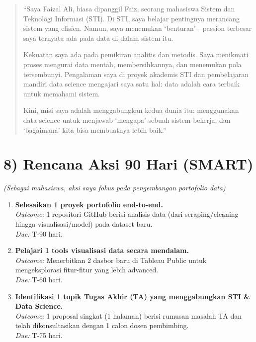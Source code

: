 \documentclass[
  letterpaper,
  DIV=11,
  numbers=noendperiod]{scrreprt}
\providecommand{\tightlist}{%
  \setlength{\itemsep}{0pt}\setlength{\parskip}{0pt}}
\begin{document}
\begin{quote}
``Saya Faizal Ali, biasa dipanggil Faiz, seorang mahasiswa Sistem dan
Teknologi Informasi (STI). Di STI, saya belajar pentingnya merancang
sistem yang efisien. Namun, saya menemukan `benturan'---passion terbesar
saya ternyata ada pada data di dalam sistem itu.

Kekuatan saya ada pada pemikiran analitis dan metodis. Saya menikmati
proses mengurai data mentah, membersihkannya, dan menemukan pola
tersembunyi. Pengalaman saya di proyek akademis STI dan pembelajaran
mandiri data science mengajari saya satu hal: data adalah cara terbaik
untuk memahami sistem.

Kini, misi saya adalah menggabungkan kedua dunia itu: menggunakan data
science untuk menjawab `mengapa' sebuah sistem bekerja, dan `bagaimana'
kita bisa membuatnya lebih baik.''
\end{quote}

\section{8) Rencana Aksi 90 Hari
(SMART)}\label{rencana-aksi-90-hari-smart}

\emph{(Sebagai mahasiswa, aksi saya fokus pada pengembangan portofolio
data)}

\begin{enumerate}
\def\labelenumi{\arabic{enumi}.}
\tightlist
\item
  \textbf{Selesaikan 1 proyek portofolio end-to-end.}\\
  \emph{Outcome:} 1 repositori GitHub berisi analisis data (dari
  scraping/cleaning hingga visualisasi/model) pada dataset baru.\\
  \emph{Due:} T-90 hari.
\item
  \textbf{Pelajari 1 tools visualisasi data secara mendalam.}\\
  \emph{Outcome:} Menerbitkan 2 dasbor baru di Tableau Public untuk
  mengeksplorasi fitur-fitur yang lebih advanced.\\
  \emph{Due:} T-60 hari.
\item
  \textbf{Identifikasi 1 topik Tugas Akhir (TA) yang menggabungkan STI
  \& Data Science.}\\
  \emph{Outcome:} 1 proposal singkat (1 halaman) berisi rumusan masalah
  TA dan telah dikonsultasikan dengan 1 calon dosen pembimbing.\\
  \emph{Due:} T-75 hari.
\end{enumerate}
\end{document}
